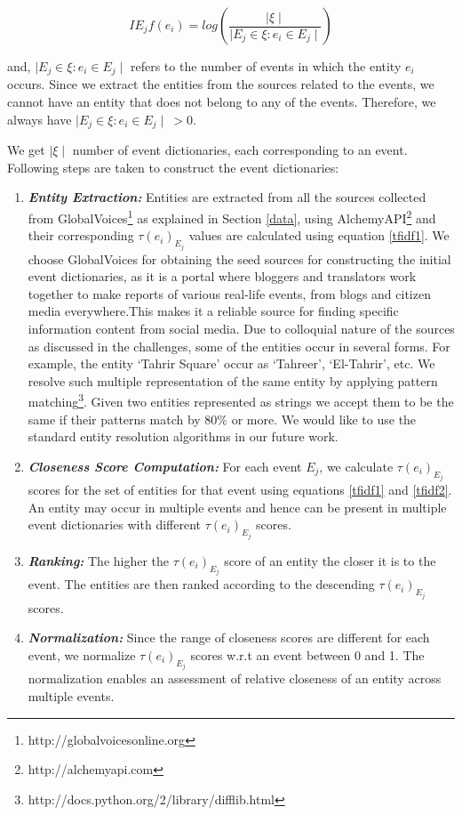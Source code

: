 \begin{equation}
\label{tfidf2}
IE_{j}f(e_{i}) = log(\frac{\mid \xi \mid}{\mid E_{j} \in \xi : e_{i} \in E_{j} \mid})
\end{equation}

\noindent and, $\mid E_{j} \in \xi : e_{i} \in E_{j} \mid$ refers to the number of events in which the entity $e_{i}$ occurs. Since we extract the entities from the sources related to the events, we cannot have an entity that does not belong to any of the events. Therefore, we always have $\mid E_{j} \in \xi : e_{i} \in E_{j} \mid \ > 0$.

We get $\mid \xi \mid$ number of event dictionaries, each corresponding to an event. Following steps are taken to construct the event dictionaries:
\begin{enumerate}
\item \textit{\textbf{Entity Extraction:}} Entities are extracted from all the sources collected from GlobalVoices\footnote{http://globalvoicesonline.org} as explained in Section \ref{data}, using AlchemyAPI\footnote{http://alchemyapi.com} and their corresponding $\tau(e_{i})_{E_{j}}$ values are calculated using equation \ref{tfidf1}. We choose GlobalVoices for obtaining the seed sources for constructing the initial event dictionaries, as it is a portal where bloggers and translators work together to make reports of various real-life events, from blogs and citizen media everywhere.This makes it a reliable source for finding specific information content from social media. Due to colloquial nature of the sources as discussed in the challenges, some of the entities occur in several forms. For example, the entity `Tahrir Square' occur as `Tahreer', `El-Tahrir', etc. We resolve such multiple representation of the same entity by applying pattern matching\footnote{http://docs.python.org/2/library/difflib.html}. Given two entities represented as strings we accept them to be the same if their patterns match by 80\% or more. We would like to use the standard entity resolution algorithms in our future work.


\item \textit{\textbf{Closeness Score Computation:}} For each event $E_{j}$, we calculate $\tau(e_{i})_{E_{j}}$ scores for the set of entities for that event using equations \ref{tfidf1} and \ref{tfidf2}. An entity may occur in multiple events and hence can be present in multiple event dictionaries with different $\tau(e_{i})_{E_{j}}$ scores.
\item \textit{\textbf{Ranking:}} The higher the $\tau(e_{i})_{E_{j}}$ score of an entity the closer it is to the event. The entities are then ranked according to the descending $\tau(e_{i})_{E_{j}}$ scores.
\item \textit{\textbf{Normalization:}} Since the range of closeness scores are different for each event, we normalize $\tau(e_{i})_{E_{j}}$ scores w.r.t an event between 0 and 1. The normalization enables an assessment of relative closeness of an entity across multiple events. 
\end{enumerate}

